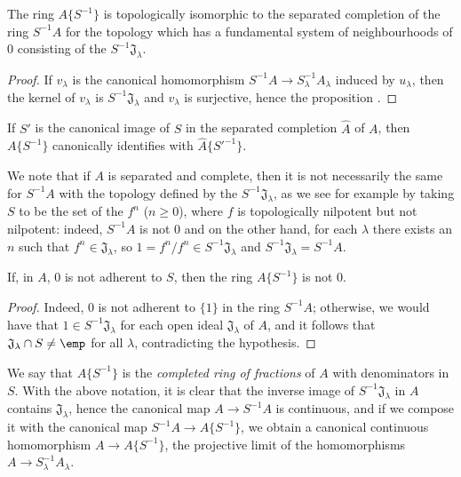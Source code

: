 \begin{proposition}[7.6.2]
\label{0.7.6.2}
The ring $A\{S^{-1}\}$ is topologically isomorphic to the separated completion of the ring
$S^{-1}A$ for the topology which has a fundamental system of neighbourhoods of $0$ consisting of
the $S^{-1}\mathfrak{J}_\lambda$.
\end{proposition}

\begin{proof}
If $v_\lambda$ is the canonical homomorphism $S^{-1}A\to S_\lambda^{-1}A_\lambda$ induced
by $u_\lambda$, then the kernel of $v_\lambda$ is $S^{-1}\mathfrak{J}_\lambda$ and
$v_\lambda$ is surjective, hence the proposition .
\end{proof}

\begin{corollary}[7.6.3]
\label{0.7.6.3}
If $S'$ is the canonical image of $S$ in the separated completion $\widehat{A}$ of $A$, then
$A\{S^{-1}\}$ canonically identifies with $\widehat{A}\{{S'}^{-1}\}$.
\end{corollary}

We note that if $A$ is separated and complete, then it is not necessarily the same for
$S^{-1}A$ with the topology defined by the $S^{-1}\mathfrak{J}_\lambda$, as we see for example
by taking $S$ to be the set of the $f^n$ ($n\geq 0$), where $f$ is topologically nilpotent
but not nilpotent: indeed, $S^{-1}A$ is not $0$ and on the other hand, for each $\lambda$ there
exists an $n$ such that $f^n\in\mathfrak{J}_\lambda$, so $1=f^n/f^n\in S^{-1}\mathfrak{J}_\lambda$
and $S^{-1}\mathfrak{J}_\lambda=S^{-1}A$.

\begin{corollary}[7.6.4]
\label{0.7.6.4}
If, in $A$, $0$ is not adherent to $S$, then the ring $A\{S^{-1}\}$ is not $0$.
\end{corollary}

\begin{proof}
Indeed, $0$ is not adherent to $\{1\}$ in the ring $S^{-1}A$; otherwise, we would have that
$1\in S^{-1}\mathfrak{J}_\lambda$ for each open ideal $\mathfrak{J}_\lambda$ of $A$, and it
follows that $\mathfrak{J}_\lambda\cap S\neq\emp$ for all $\lambda$, contradicting the
hypothesis.
\end{proof}

\begin{env}[7.6.5]
\label{0.7.6.5}
We say that $A\{S^{-1}\}$ is the \emph{completed ring of fractions} of $A$ with denominators
in $S$. With the above notation, it is clear that the inverse image of $S^{-1}\mathfrak{J}_\lambda$
in $A$ contains $\mathfrak{J}_\lambda$, hence the canonical map $A\to S^{-1}A$ is continuous, and if
we compose it with the canonical map $S^{-1}A\to A\{S^{-1}\}$, we obtain a canonical continuous
homomorphism $A\to A\{S^{-1}\}$, the projective limit of the homomorphisms
$A\to S_\lambda^{-1}A_\lambda$.
\end{env}

